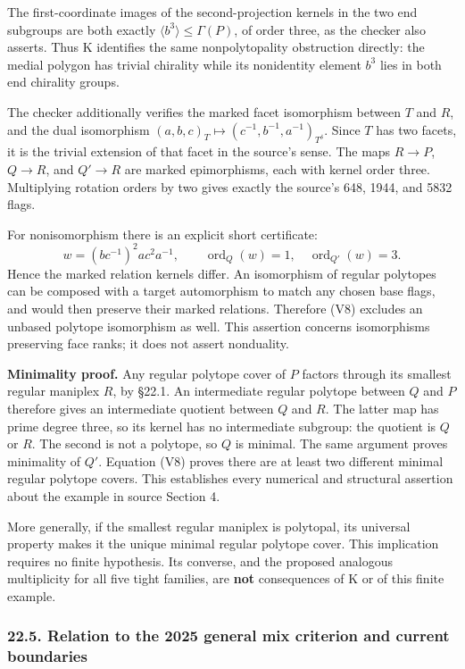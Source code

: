 \documentclass[
  10pt,
  letterpaper,
]{article}
\begin{document}
The first-coordinate images of the second-projection kernels in the two
end subgroups are both exactly \(\langle b^3\rangle\le\Gamma(P)\), of
order three, as the checker also asserts. Thus K identifies the same
nonpolytopality obstruction directly: the medial polygon has trivial
chirality while its nonidentity element \(b^3\) lies in both end
chirality groups.

The checker additionally verifies the marked facet isomorphism between
\(T\) and \(R\), and the dual isomorphism
\((a,b,c)_T\mapsto(c^{-1},b^{-1},a^{-1})_{T^\delta}\). Since \(T\) has
two facets, it is the trivial extension of that facet in the source's
sense. The maps \(R\to P\), \(Q\to R\), and \(Q'\to R\) are marked
epimorphisms, each with kernel order three. Multiplying rotation orders
by two gives exactly the source's 648, 1944, and 5832 flags.

For nonisomorphism there is an explicit short certificate: \[
 w=(bc^{-1})^2ac^2a^{-1},\qquad
 \operatorname{ord}_Q(w)=1,\quad\operatorname{ord}_{Q'}(w)=3.       \tag{V8}
\] Hence the marked relation kernels differ. An isomorphism of regular
polytopes can be composed with a target automorphism to match any chosen
base flags, and would then preserve their marked relations. Therefore
(V8) excludes an unbased polytope isomorphism as well. This assertion
concerns isomorphisms preserving face ranks; it does not assert
nonduality.

\textbf{Minimality proof.} Any regular polytope cover of \(P\) factors
through its smallest regular maniplex \(R\), by §22.1. An intermediate
regular polytope between \(Q\) and \(P\) therefore gives an intermediate
quotient between \(Q\) and \(R\). The latter map has prime degree three,
so its kernel has no intermediate subgroup: the quotient is \(Q\) or
\(R\). The second is not a polytope, so \(Q\) is minimal. The same
argument proves minimality of \(Q'\). Equation (V8) proves there are at
least two different minimal regular polytope covers. This establishes
every numerical and structural assertion about the example in source
Section 4.

More generally, if the smallest regular maniplex is polytopal, its
universal property makes it the unique minimal regular polytope cover.
This implication requires no finite hypothesis. Its converse, and the
proposed analogous multiplicity for all five tight families, are
\textbf{not} consequences of K or of this finite example.

\subsubsection{22.5. Relation to the 2025 general mix criterion and
current
boundaries}\label{relation-to-the-2025-general-mix-criterion-and-current-boundaries}
\end{document}
